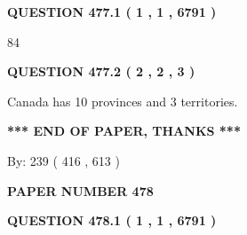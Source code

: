 \documentclass[12pt]{article}
\begin{document}
   
  
\vspace{0.2in}
  
{\textbf{\Large{QUESTION
477.1 
 ( 1 , 1 , 6791 )
}}}
  
  
 
 
\noindent{}

84
 
 
  
\vspace{0.2in}
  
{\textbf{\Large{QUESTION
477.2 
 ( 2 , 2 , 3 )
}}}
  
  
 
 
\noindent{}
 
 
Canada has 10  provinces and 3 territories.
 
 
 
 
   
   
 \vspace{0.2in}
 
   
   
   
   
\vspace{1.0in} 
{\textbf{\large{ *** END OF PAPER, THANKS *** }}} 
   
   
\hspace{1.0in} By: 
 239 ( 416 ,  613 )
   
   
   
   
\newpage 
\setcounter{page}{ 
   478001 } 
   
   
   
   
 {\textbf{ \Large{ PAPER NUMBER  478  }}}
   
   
\vspace{0.2in}
   
   
   
   
   
   
 \vspace{0.2in}
 
 
 
 
   
   
  
\vspace{0.2in}
  
{\textbf{\Large{QUESTION
478.1 
 ( 1 , 1 , 6791 )
}}}
  
\end{document}
